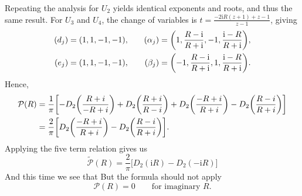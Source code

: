 \documentclass[11pt, a4paper]{article}
\newcommand{\ii}{\mathrm{i}}
\newcommand{\Li}{\operatorname{Li}}
\def\bp#1{{\color{red} #1}}
\numberwithin{equation}{section}
\begin{document}
Repeating the analysis for $U_2$ yields identical exponents and roots, and thus the same result. For $U_3$ and $U_4$, the change of variables is $t = \frac{-2 \ii R (z+1)+z-1}{z-1}$, giving
\begin{equation}
  \begin{aligned}
    (d_j) &= (1, 1, -1, -1), &\quad
    (\alpha_j) = \qty(1,\frac{R-\ii}{R+\ii},-1,\frac{\ii-R}{R+\ii}), \\
    (e_j) &= (1, 1, -1, -1), &\quad
    (\beta_j) = \qty(-1,\frac{R-\ii}{R+\ii},1,\frac{\ii-R}{R+\ii}).
  \end{aligned}
\end{equation}
Hence,
\begin{equation}\label{eqn:imagPeriod}
  \begin{aligned}
    \mathcal{P}(R)
    &= \frac{1}{\pi}\qty[-D_2\!\left(\frac{R+i}{-R+i}\right)
      + D_2\!\left(\frac{R+i}{R-i}\right)
      + D_2\!\left(\frac{-R+i}{R+i}\right)
      - D_2\!\left(\frac{R-i}{R+i}\right)] \\
    &= \frac{2}{\pi} \qty[D_2\!\left(\frac{-R+i}{R+i}\right)
      - D_2\!\left(\frac{R-i}{R+i}\right)].
  \end{aligned}
\end{equation}
Applying the five term relation gives us
\begin{equation}
  \mathcal{\tilde{P}}(R) = \frac{2}{\pi} \bigl[D_2(\ii R)-D_2(-\ii R)\bigr]
\end{equation}
And this time we see that \bp{But the formula should not apply}
\begin{equation}
  \mathcal{P}(R) = 0 \qquad \text{for imaginary } R.
\end{equation}

\end{document}
